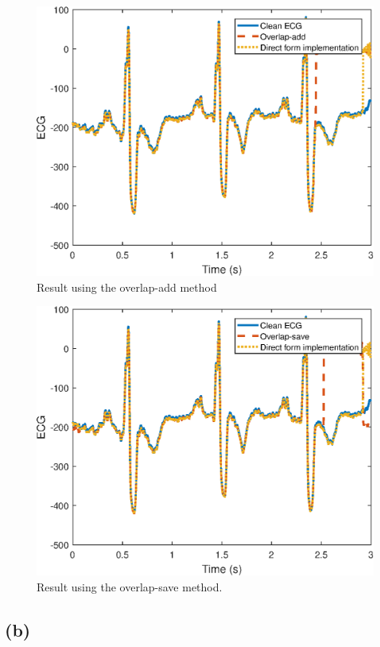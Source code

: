 \documentclass{article}
\begin{document}
\FloatBarrier
\begin{figure}[h!]
	\centering
	\includegraphics[scale=0.8]{fir_notch_overlap_add.eps}
	\caption{Result using the overlap-add method}
\end{figure}
\FloatBarrier

\FloatBarrier
\begin{figure}[h!]
	\centering
	\includegraphics[scale=0.8]{fir_notch_overlap_save.eps}
	\caption{Result using the overlap-save method.}
\end{figure}
\FloatBarrier

\subsection{(b)}
\end{document}
